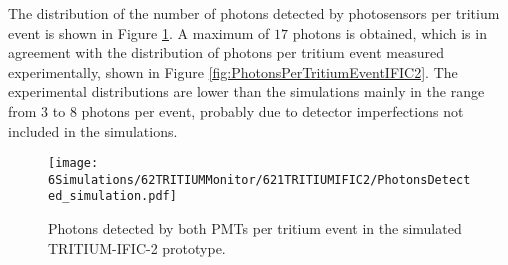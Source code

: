 The distribution of the number of photons detected by photosensors per tritium event is shown in Figure \ref{fig:SimulatedPhotonsDetected}. A maximum of $17$ photons is obtained, which is in agreement with the distribution of photons per tritium event measured experimentally, shown in Figure \ref{fig:PhotonsPerTritiumEventIFIC2}. The experimental distributions are lower than the simulations mainly in the range from $3$ to $8$ photons per event, probably due to detector imperfections not included in the simulations.

\begin{figure}[hbtp]
\centering
\texttt{[image: 6Simulations/62TRITIUMMonitor/621TRITIUMIFIC2/PhotonsDetected\_simulation.pdf]}
\caption{Photons detected by both PMTs per tritium event in the simulated TRITIUM-IFIC-2 prototype.\label{fig:SimulatedPhotonsDetected}}
\end{figure}

